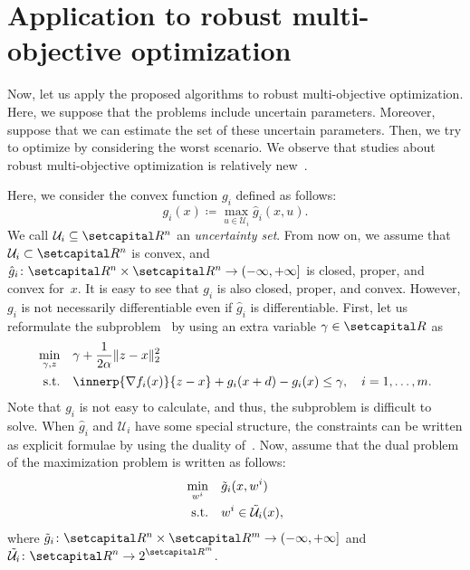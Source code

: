 \documentclass[../../main]{subfiles}
\begin{document}
\section{Application to robust multi-objective optimization} 
Now, let us apply the proposed algorithms to robust multi-objective optimization.
Here, we suppose that the problems include uncertain parameters.
Moreover, suppose that we can estimate the set of these uncertain parameters.
Then, we try to optimize by considering the worst scenario.
We observe that studies about robust multi-objective optimization is relatively new~\cite{Ehrgott2014,Fliege2014,Morishita2016}.

Here, we consider the convex function $g_i$ defined as follows:
\begin{equation} \label{eq:g_i}
    g_i(x) \coloneqq \max_{u \in {\mathcal{U}}_i } \hat{g}_i (x,u).
\end{equation}
We call ${\mathcal{U}}_i \subseteq \setR^n$ an \emph{uncertainty set}.
From now on, we assume that~${\mathcal{U}}_i \subset \setR^n$ is convex, and~$\hat{g}_i \colon \setR^n \times \setR^n \to (-\infty, +\infty]$ is closed, proper, and convex for~$x$.
It is easy to see that $g_i$ is also closed, proper, and convex.
However, $g_i$ is not necessarily differentiable even if $\hat{g}_i$ is differentiable.
First, let us reformulate the subproblem~ by using an extra variable $\gamma \in \setR$ as
\begin{equation}
    \begin{aligned}
        \min_{\gamma, z} \quad   &\gamma + \frac{1}{2 \alpha}\norm{z - x}_2^2  \\ 
        \st    \quad   &\innerp{\nabla f_i(x)}{z - x} + g_i(x+d) - g_i(x) \leq \gamma, \quad i = 1,\ldots,m.
    \end{aligned}
\end{equation}
Note that $g_i$ is not easy to calculate, and thus, the subproblem is difficult to solve.
When $\hat{g}_i$ and $\mathcal{U}_i$ have some special structure, the constraints can be written as explicit formulae by using the duality of~.
Now, assume that the dual problem of the maximization problem  is written as follows:
\begin{align}
\min_{w^i} \quad &\tilde{g}_i (x, w^i)  \\ 
\mathrm{s.t.}    \quad   &w^i \in \tilde{\mathcal{U}}_i (x),
\end{align}
where $\tilde{g}_i \colon \setR^n \times \setR^m \to (-\infty, +\infty]$ and $\displaystyle \tilde{\mathcal{U}}_i \colon \setR^n \to 2^{\setR^m}$.
\end{document}
